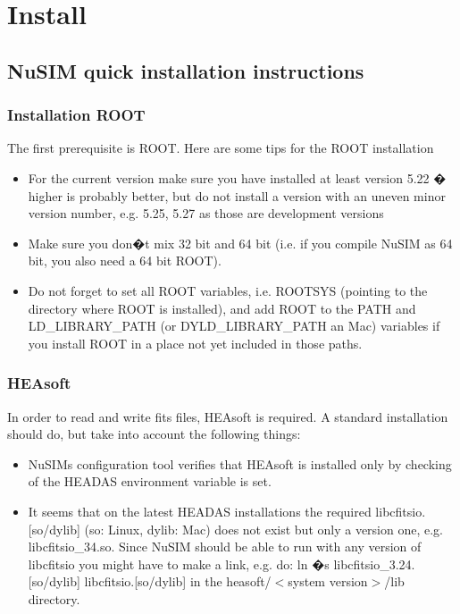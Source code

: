 \chapter{Install}

\section{NuSIM quick installation instructions}
\subsection{Installation ROOT}

The first prerequisite is ROOT. Here are some tips for the ROOT installation
\begin{itemize}
\item For the current version make sure you have installed at least version 5.22 � higher is probably  better, but do not install a version with an uneven minor version number, e.g. 5.25, 5.27 as those are development versions
\item Make sure you don�t mix 32 bit and 64 bit (i.e. if you compile NuSIM as 64 bit, you also need a 64 bit ROOT).
\item Do not forget to set all ROOT variables, i.e. ROOTSYS (pointing to the directory where ROOT is installed), and add ROOT to the PATH and LD\_LIBRARY\_PATH (or DYLD\_LIBRARY\_PATH an Mac) variables if you install ROOT in a place not yet included in those paths. 
\end{itemize}

\subsection{HEAsoft}
In order to read and write fits files, HEAsoft is required. A standard installation should do, but take into account the following things:
\begin{itemize}
\item	NuSIMs configuration tool verifies that HEAsoft is installed only by checking of the HEADAS environment variable is set.
\item	It seems that on the latest HEADAS installations the required libcfitsio.[so/dylib] (so: Linux, dylib: Mac) does not exist but 
only a version one, e.g. libcfitsio\_34.so. Since NuSIM should be able to run with any version of libcfitsio you might have to make a link, e.g. do:
ln �s libcfitsio\_3.24.[so/dylib] libcfitsio.[so/dylib]
in the heasoft/$<$system version$>$/lib directory.
\end{itemize}

